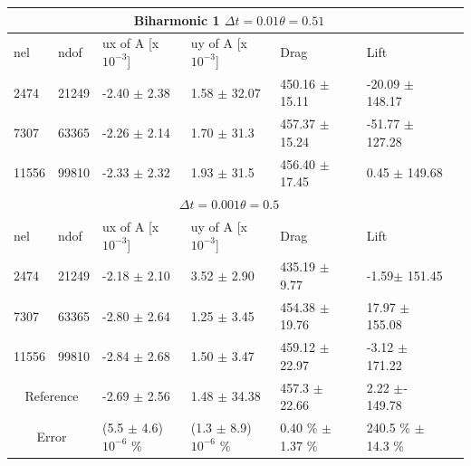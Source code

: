 \begin{table}[h!]
\centering
\label{my-label}
\begin{tabular}{ |p{1cm}||p{1cm}|p{3.2cm}|p{3.2cm}|p{2.9cm}|p{3.1cm}|p{1.2cm}|}
 \hline
  \multicolumn{6}{|c|}{Biharmonic 1 \hspace{2mm}  $\Delta t = 0.01 \theta = 0.51$} \\
   \hline
nel & ndof & ux of A [x $10^{-3}$]  &uy of A [x $10^{-3}$]& Drag  & Lift \\
 \hline
 2474     &21249  & -2.40 $\pm$ 2.38  & 1.58 $\pm$ 32.07  & 450.16  $\pm$ 15.11  & -20.09 $\pm$ 148.17 \\
 7307    & 63365  &  -2.26 $\pm$ 2.14  & 1.70  $\pm$ 31.3 & 457.37  $\pm$ 15.24 & -51.77 $\pm$ 127.28 \\
 11556   & 99810  &   -2.33 $\pm$ 2.32 &  1.93   $\pm$ 31.5  & 456.40 $\pm$ 17.45 &  0.45 $\pm$ 149.68  \\
 \hline
  \multicolumn{6}{|c|}{$\Delta t = 0.001 \theta = 0.5$} \\
   \hline
 nel & ndof & ux of A [x $10^{-3}$]  &uy of A [x $10^{-3}$]& Drag  & Lift \\
 2474    & 21249  & -2.18 $\pm$ 2.10& 3.52 $\pm$ 2.90 & 435.19   $\pm$   9.77  & -1.59$\pm$   151.45 \\
 7307    & 63365  & -2.80 $\pm$ 2.64 & 1.25 $\pm$ 3.45 & 454.38   $\pm$   19.76 & 17.97  $\pm$  155.08 \\
 11556   & 99810  & -2.84 $\pm$ 2.68  & 1.50 $\pm$ 3.47 & 459.12    $\pm$   22.97 & -3.12     $\pm$ 171.22 \\
 \hline
 \multicolumn{2}{|c|}{Reference} & -2.69 $\pm$  2.56                    & 1.48  $\pm$  34.38                   & 457.3  $\pm$  22.66        & 2.22  $\pm$- 149.78           \\
 \hline
 \multicolumn{2}{|c|}{Error}  & (5.5 $\pm$ 4.6)$10^{-6}$ \% & (1.3 $\pm$ 8.9)$10^{-6}$ \%  & 0.40 \% $\pm$ 1.37 \% & 240.5 \% $\pm$ 14.3 \%\\
 \hline
\end{tabular}
\end{table}
